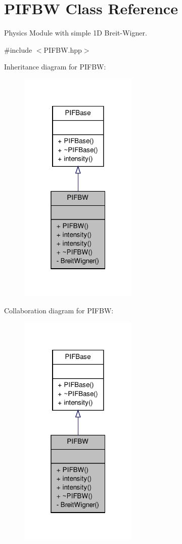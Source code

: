 \hypertarget{classPIFBW}{
\section{PIFBW Class Reference}
\label{d8/d58/classPIFBW}
}


Physics Module with simple 1D Breit-\/Wigner.  




{\ttfamily \#include $<$PIFBW.hpp$>$}



Inheritance diagram for PIFBW:\nopagebreak
\begin{figure}[H]
\begin{center}
\leavevmode
\includegraphics[width=160pt]{dc/de4/classPIFBW__inherit__graph}
\end{center}
\end{figure}


Collaboration diagram for PIFBW:\nopagebreak
\begin{figure}[H]
\begin{center}
\leavevmode
\includegraphics[width=160pt]{d3/d9b/classPIFBW__coll__graph}
\end{center}
\end{figure}
